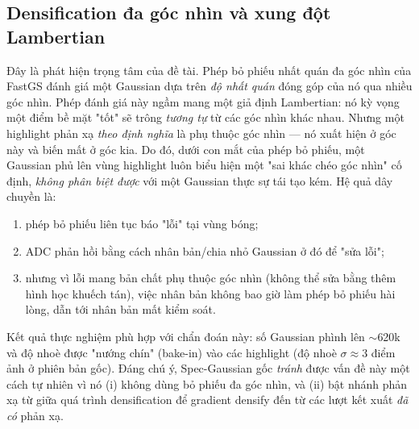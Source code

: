     \subsection{Densification đa góc nhìn và xung đột Lambertian}
    \label{ssec:lambertian}
    Đây là phát hiện trọng tâm của đề tài. Phép bỏ phiếu nhất quán đa góc nhìn của
    FastGS \cite{fastgs} đánh giá một Gaussian dựa trên \textit{độ nhất quán} đóng
    góp của nó qua nhiều góc nhìn. Phép đánh giá này ngầm mang một giả định
    Lambertian: nó kỳ vọng một điểm bề mặt "tốt" sẽ trông \textit{tương tự} từ các
    góc nhìn khác nhau. Nhưng một highlight phản xạ \textit{theo định nghĩa} là phụ
    thuộc góc nhìn — nó xuất hiện ở góc này và biến mất ở góc kia. Do đó, dưới con
    mắt của phép bỏ phiếu, một Gaussian phủ lên vùng highlight luôn biểu hiện một
    "sai khác chéo góc nhìn" cố định, \textit{không phân biệt được} với một Gaussian
    thực sự tái tạo kém. Hệ quả dây chuyền là:
    \begin{enumerate}
        \item phép bỏ phiếu liên tục báo "lỗi" tại vùng bóng;
        \item ADC phản hồi bằng cách nhân bản/chia nhỏ Gaussian ở đó để "sửa lỗi";
        \item nhưng vì lỗi mang bản chất phụ thuộc góc nhìn (không thể sửa bằng thêm
        hình học khuếch tán), việc nhân bản không bao giờ làm phép bỏ phiếu hài
        lòng, dẫn tới nhân bản mất kiểm soát.
    \end{enumerate}
    Kết quả thực nghiệm phù hợp với chẩn đoán này: số Gaussian phình lên $\sim$620k
    và độ nhoè được "nướng chín" (bake-in) vào các highlight (độ nhoè $\sigma \approx
    3$ điểm ảnh ở phiên bản gốc). Đáng chú ý, Spec-Gaussian gốc \textit{tránh} được
    vấn đề này một cách tự nhiên vì nó (i) không dùng bỏ phiếu đa góc nhìn, và (ii)
    bật nhánh phản xạ từ giữa quá trình densification để gradient densify đến từ các
    lượt kết xuất \textit{đã có} phản xạ.

